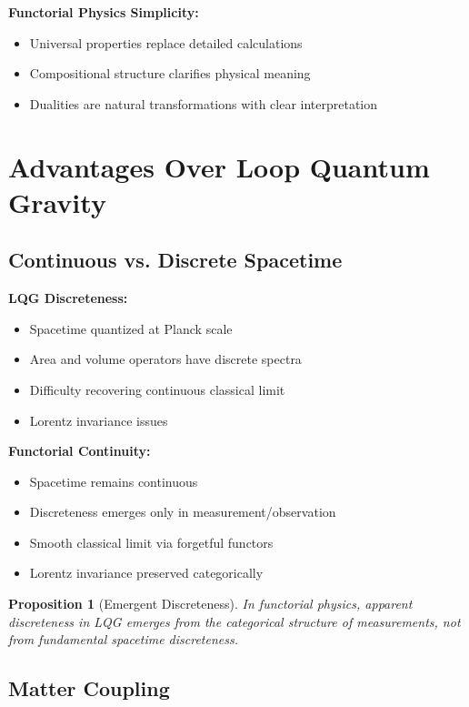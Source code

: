\documentclass[11pt,a4paper]{article}
\newtheorem{proposition}[theorem]{Proposition}
\begin{document}
\textbf{Functorial Physics Simplicity:}
\begin{itemize}
    \item Universal properties replace detailed calculations
    \item Compositional structure clarifies physical meaning
    \item Dualities are natural transformations with clear interpretation
\end{itemize}

\section{Advantages Over Loop Quantum Gravity}

\subsection{Continuous vs. Discrete Spacetime}

\textbf{LQG Discreteness:}
\begin{itemize}
    \item Spacetime quantized at Planck scale
    \item Area and volume operators have discrete spectra
    \item Difficulty recovering continuous classical limit
    \item Lorentz invariance issues
\end{itemize}

\textbf{Functorial Continuity:}
\begin{itemize}
    \item Spacetime remains continuous
    \item Discreteness emerges only in measurement/observation
    \item Smooth classical limit via forgetful functors
    \item Lorentz invariance preserved categorically
\end{itemize}

\begin{proposition}[Emergent Discreteness]
In functorial physics, apparent discreteness in LQG emerges from the categorical structure of measurements, not from fundamental spacetime discreteness.
\end{proposition}

\subsection{Matter Coupling}
\end{document}
